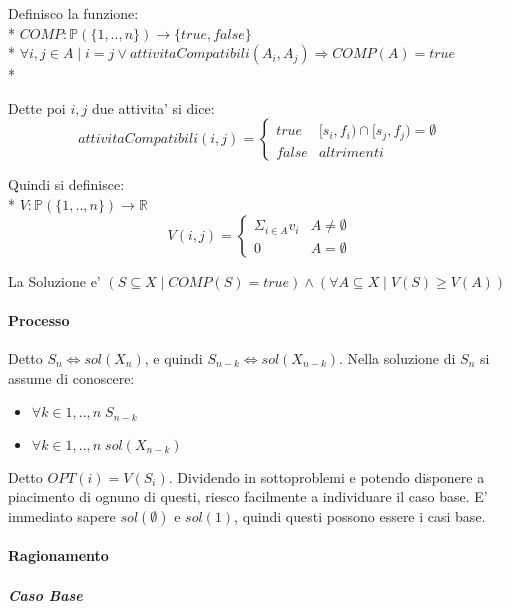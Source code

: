 Definisco la funzione: \\*
$COMP : \mathbb{P}(\{1,..,n\}) \rightarrow \{true, false\}$ \\*
$\forall i,j \in A \mid i = j \lor attivitaCompatibili(A_i,A_j) \Rightarrow COMP(A) = true$ \\*

Dette poi $i,j$ due attivita' si dice:
\[
    attivitaCompatibili(i,j) =
    \begin{cases}
        \text{$true$} & \text{$[s_i, f_i) \cap [s_j, f_j) = \emptyset$} \\
        \text{$false$} & altrimenti
    \end{cases}
\]

Quindi si definisce: \\*
$V : \mathbb{P}(\{1,..,n\}) \rightarrow \mathbb{R}$
\[
    V(i,j) =
    \begin{cases}
        \text{$\Sigma _ {i \in A} v_i$} & \text{$A \ne \emptyset$} \\
        \text{$0$} & \text{$A = \emptyset$}
    \end{cases}
\]

La Soluzione e' $(S \subseteq X \mid COMP(S) = true) \land (\forall A \subseteq X \mid V(S) \geq V(A))$

\paragraph{Processo}

Detto $S_n \Leftrightarrow sol(X_n)$, e quindi $S_{n-k} \Leftrightarrow sol(X_{n-k})$.
Nella soluzione di $S_n$ si assume di conoscere:

\begin{itemize}
    \item $\forall k \in {1,..,n} \; S_{n-k}$
    \item $\forall k \in {1,..,n} \; sol(X_{n-k})$
\end{itemize}

Detto $OPT(i) = V(S_i)$.
Dividendo in sottoproblemi e potendo disponere a piacimento di ognuno di questi, riesco facilmente a individuare il caso base.
E' immediato sapere $sol(\emptyset)$ e $sol({1})$, quindi questi possono essere i casi base.

\paragraph{Ragionamento}

\subparagraph{Caso Base}

